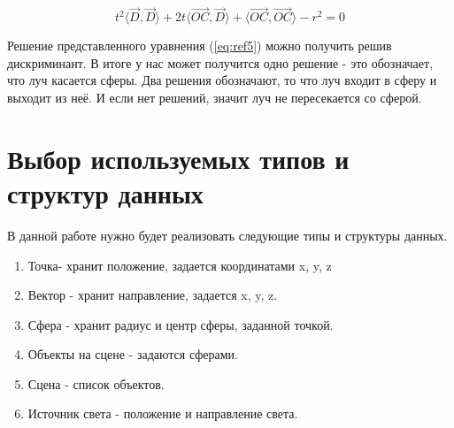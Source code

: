 \begin{equation}
t^2 \langle \overrightarrow{D}, \overrightarrow{D} \rangle + 2t \langle \overrightarrow{OC}, \overrightarrow{D} \rangle + \langle \overrightarrow{OC}, \overrightarrow{OC} \rangle -r^2 = 0
\label{eq:ref8}
\end{equation}

Решение представленного уравнения (\ref{eq:ref5}) можно получить решив дискриминант. В итоге у нас может получится одно решение - это обозначает, что луч касается сферы. Два решения обозначают, то что луч входит в сферу и выходит из неё. И если нет решений, значит луч не пересекается со сферой.

\section{Выбор используемых типов и структур данных}

В данной работе нужно будет реализовать следующие типы и структуры данных.
\begin{enumerate}
	\item Точка- хранит положение, задается координатами x, y, z 
	\item Вектор - хранит направление, задается x, y, z.
	\item Сфера - хранит радиус и центр сферы, заданной точкой.
	\item Объекты на сцене - задаются сферами.
	\item Сцена - список объектов.
	\item Источник света - положение и направление света.
\end{enumerate}








